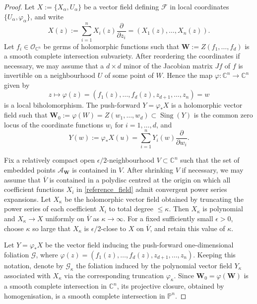 \documentclass[10pt,twoside]{amsart}
\numberwithin{equation}{section}
\theoremstyle{definition}
\theoremstyle{remark}
\DeclareMathOperator{\sing}{Sing}
\newcommand{\C}{\mathbb{C}}
\newcommand{\F}{\mathcal{F}}
\newcommand{\oo}{\mathcal{O}}
\newcommand{\W}{\mathbf{W}}
\begin{document}
\begin{proof}
Let $X:=\{X_\alpha,U_\alpha\}$ be a vector field defining $\F$ in local coordinates $\{U_\alpha,\varphi_\alpha\}$, and write
\begin{equation}\label{reference_field}
X(z):=\sum_{i=1}^n X_i(z)\frac{\partial}{\partial z_i}=(X_1(z),\ldots,X_n(z)).
\end{equation}
Let $f_i\in \oo_{\C^n}$ be germs of holomorphic functions such that
$\W:=Z(f_1,\ldots,f_d)$ is a smooth complete intersection subvariety.
After reordering the coordinates if necessary, we may assume that a $d\times d$ minor of the Jacobian matrix $Jf$ of $f$
is invertible on a neighbourhood $U$ of some point of $W$.
Hence the map $\varphi:\C^n\to\C^n$ given by
\[
z\longmapsto \varphi(z)=(f_1(z),\ldots,f_d(z),z_{d+1},\ldots,z_n)=w
\]
is a local biholomorphism.
The push-forward $Y=\varphi_*X$ is a holomorphic vector field such that
$\W_0:=\varphi(W)=Z(w_1,\ldots,w_d)\subset\sing(Y)$ is the common zero locus of the coordinate functions $w_i$ for $i=1,\ldots,d$, and
\begin{equation}\label{eq:push-forward-field}
Y(w):=\varphi_*X(u)=\sum_{i=1}^n Y_i(w)\frac{\partial}{\partial w_i}.
\end{equation}

Fix a relatively compact open $\epsilon/2$-neighbourhood $V\subset\C^n$ such that the set of embedded points $\mathcal{A}_{\W}$
is contained in $V$.
After shrinking $V$ if necessary, we may assume that $\overline V$ is contained in a polydisc centred at the origin on which all coefficient functions $X_i$
in \eqref{reference_field} admit convergent power series expansions.
Let $X_\kappa$ be the holomorphic vector field obtained by truncating the power series of each coefficient $X_i$ to total degree $\leq \kappa$.
Then $X_\kappa$ is polynomial and $X_\kappa\to X$ uniformly on $\overline V$ as $\kappa\to\infty$.
For a fixed sufficiently small $\epsilon>0$, choose $\kappa$ so large that $X_\kappa$ is $\epsilon/2$-close to $X$ on $\overline V$, and retain this value of $\kappa$.

Let $Y=\varphi_*X$ be the vector field inducing the push-forward one-dimensional foliation $\mathcal{G}$, where
$\varphi(z)=(f_1(z),\ldots,f_d(z),z_{d+1},\ldots,z_n)$.
Keeping this notation, denote by $\mathcal{G}_\kappa$ the foliation induced by the polynomial vector field $Y_\kappa$
associated with $X_\kappa$ via the corresponding truncation $\varphi_\kappa$.
Since $\W_0=\varphi(\W)$ is a smooth complete intersection in $\C^n$, its projective closure, obtained by homogenisation, is a smooth complete intersection in $\mathbb P^n$.


\end{proof}
\end{document}
